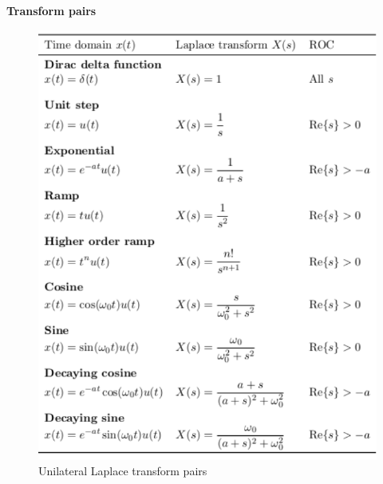 \newpage
\textbf{Transform pairs}
\begin{figure}[!h]
    \centering
    \includegraphics[width=12cm]{image/unilateral-Laplace-transform-pairs.pdf}
    \caption{Unilateral Laplace transform pairs}
\end{figure}

\newpage
